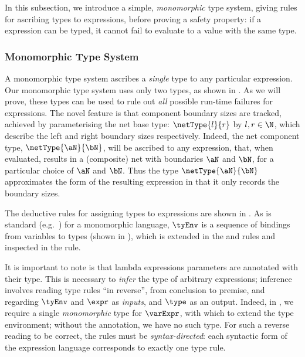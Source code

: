 In this subsection, we introduce a simple, \emph{monomorphic} type
system, giving rules for ascribing types to expressions, before proving a
safety property: if a expression can be typed, it cannot fail to evaluate to a
value with the same type.

\subsubsection{Monomorphic Type System}

A monomorphic type system ascribes a \emph{single} type to any particular
expression. Our monomorphic type system uses only two types, as shown in
.  As we will prove, these types can be used to rule out
\emph{all} possible run-time failures for \DSL{} expressions. The novel feature
is that component boundary sizes are tracked, achieved by parameterising the
net base type: $\netType{l}{r}$ by $l, r\in \N$, which describe the left and
right boundary sizes respectively. Indeed, the net component type,
$\netType{\aN}{\bN}$, will be ascribed to any expression, that, when evaluated,
results in a (composite) net with boundaries $\aN$ and $\bN$, for a particular
choice of $\aN$ and $\bN$. Thus the type $\netType{\aN}{\bN}$ approximates the
form of the resulting expression in that it only records the boundary sizes.

The deductive rules for assigning types to \DSL{} expressions are shown in
. As is standard (e.g.~\cite{Pierce2002}) for a
monomorphic language, $\tyEnv$ is a sequence of bindings from variables to
types (shown in ), which is extended in the
\inferenceRule{\bindTyRuleName} and \inferenceRule{\lamTyRuleName} rules and
inspected in the \inferenceRule{\varTyRuleName} rule.

It is important to note is that lambda expressions parameters are annotated
with their type. This is necessary to \emph{infer} the type of arbitrary
expressions; inference involves reading type rules ``in reverse'', from
conclusion to premise, and regarding $\tyEnv$ and $\expr$ as \emph{inputs}, and
$\type$ as an output.  Indeed, in \inferenceRule{\lamTyRuleName}, we require a
single \emph{monomorphic} type for $\varExpr$, with which to extend the type
environment; without the annotation, we have no such type. For such a reverse
reading to be correct, the rules must be \emph{syntax-directed}: each syntactic
form of the expression language corresponds to exactly one type rule.

